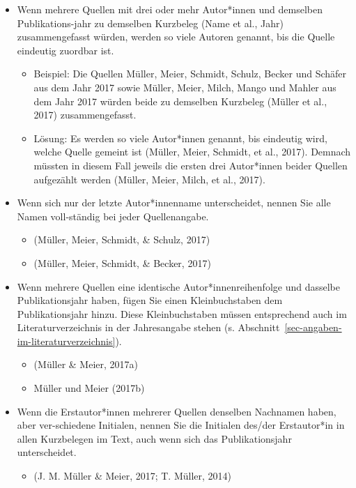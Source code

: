 \documentclass[
  letterpaper,
  DIV=11]{scrreprt}
\providecommand{\tightlist}{%
  \setlength{\itemsep}{0pt}\setlength{\parskip}{0pt}}\usepackage{longtable,booktabs,array}
\begin{document}
\begin{itemize}
\item
  Wenn mehrere Quellen mit drei oder mehr Autor*innen und demselben
  Publikations-jahr zu demselben Kurzbeleg (Name et al., Jahr)
  zusammengefasst würden, werden so viele Autoren genannt, bis die
  Quelle eindeutig zuordbar ist.

  \begin{itemize}
  \item
    Beispiel: Die Quellen Müller, Meier, Schmidt, Schulz, Becker und
    Schäfer aus dem Jahr 2017 sowie Müller, Meier, Milch, Mango und
    Mahler aus dem Jahr 2017 würden beide zu demselben Kurzbeleg (Müller
    et al., 2017) zusammengefasst.
  \item
    Lösung: Es werden so viele Autor*innen genannt, bis eindeutig wird,
    welche Quelle gemeint ist (Müller, Meier, Schmidt, et al., 2017).
    Demnach müssten in diesem Fall jeweils die ersten drei Autor*innen
    beider Quellen aufgezählt werden (Müller, Meier, Milch, et al.,
    2017).
  \end{itemize}
\item
  Wenn sich nur der letzte Autor*innenname unterscheidet, nennen Sie
  alle Namen voll-ständig bei jeder Quellenangabe.

  \begin{itemize}
  \item
    (Müller, Meier, Schmidt, \& Schulz, 2017)
  \item
    (Müller, Meier, Schmidt, \& Becker, 2017)
  \end{itemize}
\item
  Wenn mehrere Quellen eine identische Autor*innenreihenfolge und
  dasselbe Publikationsjahr haben, fügen Sie einen Kleinbuchstaben dem
  Publikationsjahr hinzu. Diese Kleinbuchstaben müssen entsprechend auch
  im Literaturverzeichnis in der Jahresangabe stehen (s.
  Abschnitt~\ref{sec-angaben-im-literaturverzeichnis}).

  \begin{itemize}
  \item
    (Müller \& Meier, 2017a)
  \item
    Müller und Meier (2017b)
  \end{itemize}
\item
  Wenn die Erstautor*innen mehrerer Quellen denselben Nachnamen haben,
  aber ver-schiedene Initialen, nennen Sie die Initialen des/der
  Erstautor*in in allen Kurzbelegen im Text, auch wenn sich das
  Publikationsjahr unterscheidet.

  \begin{itemize}
  \tightlist
  \item
    (J. M. Müller \& Meier, 2017; T. Müller, 2014)
  \end{itemize}
\end{itemize}
\end{document}
